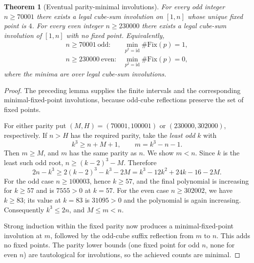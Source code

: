 \documentclass[10pt]{article}
\newtheorem{theorem}{Theorem}
\begin{document}
\begin{theorem}[Eventual parity-minimal involutions]
\label{thm:minimal-fixed}
For every odd integer $n\ge70001$
there exists a legal cube-sum involution
on $[1,n]$ whose \emph{unique} fixed
point is $4$. For every even integer
$n\ge230000$ there exists a legal
cube-sum involution of $[1,n]$
with \emph{no fixed point}.
Equivalently,
\[
\boxed{\displaystyle
\begin{array}{ll}
n\ge70001\ \text{odd}:&
\min_{p^2=\mathrm{id}}\#\mathrm{Fix}(p)=1,\\
n\ge230000\ \text{even}:&
\min_{p^2=\mathrm{id}}\#\mathrm{Fix}(p)=0,
\end{array}}
\]
where the minima are over legal
cube-sum involutions.
\end{theorem}
\begin{proof}
The preceding lemma supplies
the finite intervals and the
corresponding minimal-fixed-point
involutions, because odd-cube
reflections preserve the set of
fixed points.

For either parity put
$(M,H)=(70001,100001)$ or
$(230000,302000)$, respectively.
If $n>H$ has the required parity,
take the \emph{least odd} $k$
with
\[
k^3\ge n+M+1,\qquad
m=k^3-n-1.
\]
Then $m\ge M$, and $m$ has the
same parity as $n$. We show
$m<n$. Since $k$ is the least
such odd root,
$n\ge(k-2)^3-M$.
Therefore
\[
2n-k^3\ge
2(k-2)^3-k^3-2M
=k^3-12k^2+24k-16-2M.
\]
For the odd case $n\ge100003$,
hence $k\ge57$, and the final
polynomial is increasing for
$k\ge57$ and is $7555>0$
at $k=57$.
For the even case $n\ge302002$,
we have $k\ge83$; its value
at $k=83$ is $31095>0$ and
the polynomial is again increasing.
Consequently $k^3\le2n$,
and $M\le m<n$.

Strong induction within the
fixed parity now produces a
minimal-fixed-point involution
at $m$, followed by the
odd-cube suffix reflection
from $m$ to $n$. This adds
no fixed points. The parity
lower bounds (one fixed point
for odd $n$, none for even $n$)
are tautological for involutions,
so the achieved counts are minimal.
\end{proof}
\end{document}
